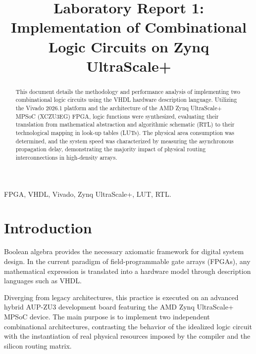 \documentclass[conference]{IEEEtran}
\begin{document}
\title{Laboratory Report 1: Implementation of Combinational Logic Circuits on Zynq UltraScale+\\}

\author{
} 
\maketitle

\begin{abstract}
This document details the methodology and performance analysis of implementing two combinational logic circuits using the VHDL hardware description language. Utilizing the Vivado 2026.1 platform and the architecture of the AMD Zynq UltraScale+ MPSoC (XCZU3EG) FPGA, logic functions were synthesized, evaluating their translation from mathematical abstraction and algorithmic schematic (RTL) to their technological mapping in look-up tables (LUTs). The physical area consumption was determined, and the system speed was characterized by measuring the asynchronous propagation delay, demonstrating the majority impact of physical routing interconnections in high-density arrays.
\end{abstract}

\begin{IEEEkeywords}
FPGA, VHDL, Vivado, Zynq UltraScale+, LUT, RTL.
\end{IEEEkeywords}

\section{Introduction}
Boolean algebra provides the necessary axiomatic framework for digital system design. In the current paradigm of field-programmable gate arrays (FPGAs), any mathematical expression is translated into a hardware model through description languages such as VHDL. 

Diverging from legacy architectures, this practice is executed on an advanced hybrid AUP-ZU3 development board featuring the AMD Zynq UltraScale+ MPSoC device. The main purpose is to implement two independent combinational architectures, contrasting the behavior of the idealized logic circuit with the instantiation of real physical resources imposed by the compiler and the silicon routing matrix.
\end{document}
